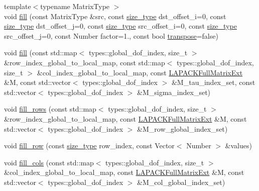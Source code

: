 \begin{DoxyCompactItemize}
\item 
{\footnotesize template$<$typename Matrix\+Type $>$ }\\void \hyperlink{classLAPACKFullMatrixExt_a305ba1b717f1c27d6245bac2f5aad6f1}{fill} (const Matrix\+Type \&src, const \hyperlink{classLAPACKFullMatrixExt_a5cf5f4a6104dc17029210b5ca52bf574}{size\+\_\+type} dst\+\_\+offset\+\_\+i=0, const \hyperlink{classLAPACKFullMatrixExt_a5cf5f4a6104dc17029210b5ca52bf574}{size\+\_\+type} dst\+\_\+offset\+\_\+j=0, const \hyperlink{classLAPACKFullMatrixExt_a5cf5f4a6104dc17029210b5ca52bf574}{size\+\_\+type} src\+\_\+offset\+\_\+i=0, const \hyperlink{classLAPACKFullMatrixExt_a5cf5f4a6104dc17029210b5ca52bf574}{size\+\_\+type} src\+\_\+offset\+\_\+j=0, const Number factor=1., const bool \hyperlink{classLAPACKFullMatrixExt_ac46d71bc1b0288fce7ad44b222e9210b}{transpose}=false)
\item 
void \hyperlink{classLAPACKFullMatrixExt_a64a3f3cf133fc6e1044535b28130e0a1}{fill} (const std\+::map$<$ types\+::global\+\_\+dof\+\_\+index, size\+\_\+t $>$ \&row\+\_\+index\+\_\+global\+\_\+to\+\_\+local\+\_\+map, const std\+::map$<$ types\+::global\+\_\+dof\+\_\+index, size\+\_\+t $>$ \&col\+\_\+index\+\_\+global\+\_\+to\+\_\+local\+\_\+map, const \hyperlink{classLAPACKFullMatrixExt}{L\+A\+P\+A\+C\+K\+Full\+Matrix\+Ext} \&M, const std\+::vector$<$ types\+::global\+\_\+dof\+\_\+index $>$ \&M\+\_\+tau\+\_\+index\+\_\+set, const std\+::vector$<$ types\+::global\+\_\+dof\+\_\+index $>$ \&M\+\_\+sigma\+\_\+index\+\_\+set)
\item 
void \hyperlink{classLAPACKFullMatrixExt_a769c252524d12cf453bff2bc881a246d}{fill\+\_\+rows} (const std\+::map$<$ types\+::global\+\_\+dof\+\_\+index, size\+\_\+t $>$ \&row\+\_\+index\+\_\+global\+\_\+to\+\_\+local\+\_\+map, const \hyperlink{classLAPACKFullMatrixExt}{L\+A\+P\+A\+C\+K\+Full\+Matrix\+Ext} \&M, const std\+::vector$<$ types\+::global\+\_\+dof\+\_\+index $>$ \&M\+\_\+row\+\_\+global\+\_\+index\+\_\+set)
\item 
void \hyperlink{classLAPACKFullMatrixExt_a127d66494b154288d3c0c4c7f865650f}{fill\+\_\+row} (const \hyperlink{classLAPACKFullMatrixExt_a5cf5f4a6104dc17029210b5ca52bf574}{size\+\_\+type} row\+\_\+index, const Vector$<$ Number $>$ \&values)
\item 
void \hyperlink{classLAPACKFullMatrixExt_ac1dcaa9fe085860f88c1034adb06f43e}{fill\+\_\+cols} (const std\+::map$<$ types\+::global\+\_\+dof\+\_\+index, size\+\_\+t $>$ \&col\+\_\+index\+\_\+global\+\_\+to\+\_\+local\+\_\+map, const \hyperlink{classLAPACKFullMatrixExt}{L\+A\+P\+A\+C\+K\+Full\+Matrix\+Ext} \&M, const std\+::vector$<$ types\+::global\+\_\+dof\+\_\+index $>$ \&M\+\_\+col\+\_\+global\+\_\+index\+\_\+set)

\end{DoxyCompactItemize}
